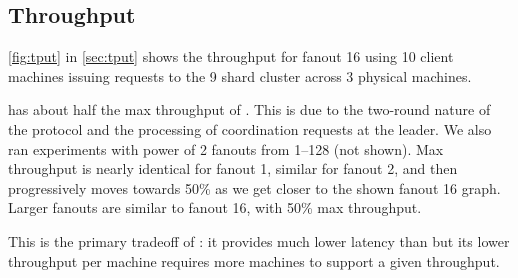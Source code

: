 


\subsection{Throughput}
\label{subsec:eval-tput}
 \cref{fig:tput} in \cref{sec:tput} shows the throughput for fanout 16 using 10 client machines issuing requests to the 9 shard cluster across 3 physical machines. 


\sys{} has about half the max throughput of \mpaxos{}. This is due to the two-round nature of the protocol and the processing of coordination requests at the leader. We also ran experiments with power of 2 fanouts from 1--128 (not shown). Max throughput is nearly identical for fanout 1, similar for fanout 2, and then progressively moves towards 50\% as we get closer to the shown fanout 16 graph. Larger fanouts are similar to fanout 16, with 50\% max throughput.

This is the primary tradeoff of \sys{}: it provides much lower latency than \mpaxos{} but its lower throughput per machine requires more machines to support a given throughput.


